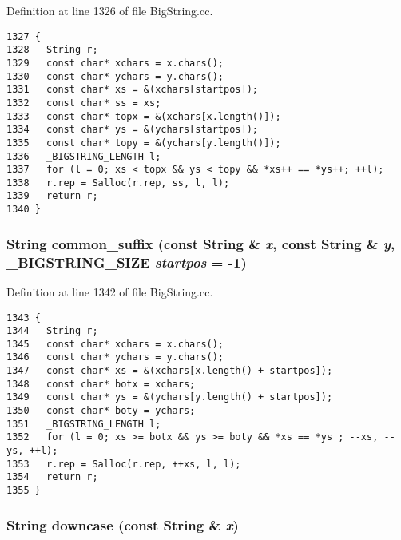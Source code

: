 Definition at line 1326 of file Big\-String.cc.



\footnotesize\begin{verbatim}1327 {
1328   String r;
1329   const char* xchars = x.chars();
1330   const char* ychars = y.chars();
1331   const char* xs = &(xchars[startpos]);
1332   const char* ss = xs;
1333   const char* topx = &(xchars[x.length()]);
1334   const char* ys = &(ychars[startpos]);
1335   const char* topy = &(ychars[y.length()]);
1336   _BIGSTRING_LENGTH l;
1337   for (l = 0; xs < topx && ys < topy && *xs++ == *ys++; ++l);
1338   r.rep = Salloc(r.rep, ss, l, l);
1339   return r;
1340 }
\end{verbatim}\normalsize 
{}
\subsubsection{\setlength{\rightskip}{0pt plus 5cm}String common\_\-suffix (const String \& {\em x}, const String \& {\em y}, {\bf \_\-BIGSTRING\_\-SIZE} {\em startpos} = -1)\hspace{0.3cm}{\tt  [friend]}}\label{classString_l40}




Definition at line 1342 of file Big\-String.cc.



\footnotesize\begin{verbatim}1343 {
1344   String r;
1345   const char* xchars = x.chars();
1346   const char* ychars = y.chars();
1347   const char* xs = &(xchars[x.length() + startpos]);
1348   const char* botx = xchars;
1349   const char* ys = &(ychars[y.length() + startpos]);
1350   const char* boty = ychars;
1351   _BIGSTRING_LENGTH l;
1352   for (l = 0; xs >= botx && ys >= boty && *xs == *ys ; --xs, --ys, ++l);
1353   r.rep = Salloc(r.rep, ++xs, l, l);
1354   return r;
1355 }
\end{verbatim}\normalsize 
{}
\subsubsection{\setlength{\rightskip}{0pt plus 5cm}String downcase (const String \& {\em x})\hspace{0.3cm}{\tt  [friend]}}\label{classString_l46}




